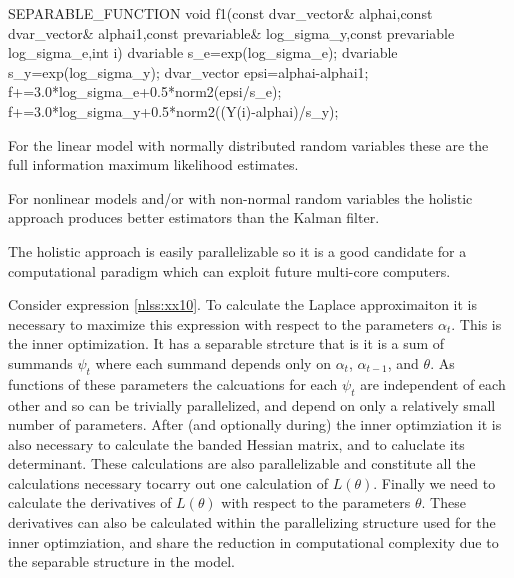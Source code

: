 SEPARABLE_FUNCTION void f1(const dvar_vector& alphai,const dvar_vector& alphai1,const prevariable& log_sigma_y,const prevariable log_sigma_e,int i)
  dvariable s_e=exp(log_sigma_e);
  dvariable s_y=exp(log_sigma_y);
  dvar_vector epsi=alphai-alphai1;
  f+=3.0*log_sigma_e+0.5*norm2(epsi/s_e);
  f+=3.0*log_sigma_y+0.5*norm2((Y(i)-alphai)/s_y);

\endexampledf


For the linear model with normally distributed random variables
these are the full information maximum likelihood estimates. 

For nonlinear models and/or with non-normal random variables
 the holistic approach produces better estimators than the Kalman filter.

The holistic approach is easily parallelizable so it 
is a  good candidate for a computational paradigm which can exploit
future multi-core computers.

Consider expression \ref{nlss:xx10}. 
To calculate the Laplace approximaiton it 
is necessary to maximize this expression with respect to the parameters 
$\alpha_t$. This is the inner optimization. It has a separable
strcture that is it is a sum of  summands $\psi_t$
where each summand depends only on
$\alpha_t$, $\alpha_{t-1}$, and
$\theta$. As functions of these parameters the calcuations for each $\psi_t$
are independent of each other and so can be trivially parallelized,
and depend on only a relatively small number of parameters.
After (and optionally during) the inner optimziation it is 
also necessary to calculate the banded Hessian matrix, and to
caluclate its determinant. These calculations are also 
parallelizable and constitute all the calculations necessary tocarry out 
one calculation  of $L(\theta)$. Finally we need to calculate the
derivatives of $L(\theta)$ with respect to the parameters $\theta$.
These derivatives can also be calculated within the 
parallelizing structure used for the inner optimziation,
and share the reduction in computational complexity due to the separable
structure in the model.

\def\Nipjp{N_{i+1,j+1}}
\def\Nipm{N_{i+1,m}}
\def\Nij{N_{ij}}
\def\nij{n_{ij}}
\def\Ei{E_i}
\def\Nio{N_{i1}}
\def\Nim{N_{im}}
\def\Nnpj{N_{n+1,j}}
\def\nnpj{n_{n+1,j}}
\def\Nimm{N_{i,m-1}}
\def\Zij{Z_{ij}}
\def\Fij{F_{ij}}
\def\Zim{Z_{im}}
\def\Zimm{Z_{i,m-1}}
\def\qip{q_{i+1}}
\def\qi{q_i}
\def\ui{u_i}
\def\sj{s_j}
\def\deltai{\delta_i}
\def\di{d_i}
\def\epsij{\epsilon_{ij}}
\def\gami{\gam_i}
\def\lami{\lambda_i}
\def\etai{\eta_i}
\def\Cijobs{C^{obs}_{ij}}
\def\Cij{C_{ij}}

